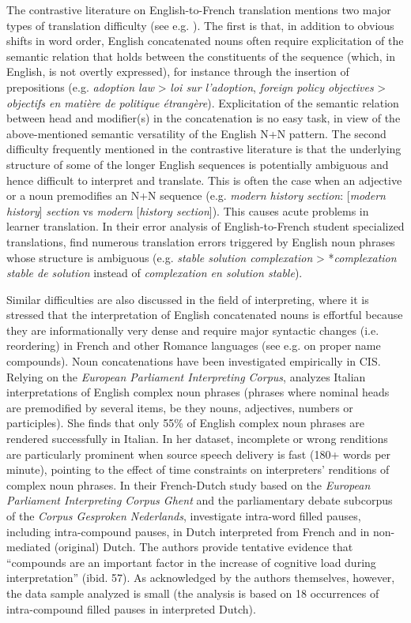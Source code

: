 \documentclass[output=paper]{langscibook}
\begin{document}
The contrastive literature on English-to-French translation mentions two major types of translation difficulty (see e.g. \citealt{ChuquetPaillard1987}). The first is that, in addition to obvious shifts in word order, English concatenated nouns often require explicitation of the semantic relation that holds between the constituents of the sequence (which, in English, is not overtly expressed), for instance through the insertion of prepositions (e.g. \textit{adoption law} > \textit{loi sur l’adoption}, \textit{foreign policy objectives} > \textit{objectifs en matière de politique étrangère}). Explicitation of the semantic relation between head and modifier(s) in the concatenation is no easy task, in view of the above-mentioned semantic versatility of the English N+N pattern. The second difficulty frequently mentioned in the contrastive literature is that the underlying structure of some of the longer English sequences is potentially ambiguous and hence difficult to interpret and translate. This is often the case when an adjective or a noun premodifies an N+N sequence (e.g. \textit{modern history section}: [\textit{modern history}] \textit{section} vs \textit{modern} [\textit{history section}]). This causes acute problems in learner translation. In their error analysis of English-to-French student specialized translations, \citet{KueblerEtAl2022} find numerous translation errors triggered by English noun phrases whose structure is ambiguous (e.g. \textit{stable solution complexation} > *\textit{complexation stable de solution} instead of \textit{complexation en solution stable}). 

Similar difficulties are also discussed in the field of interpreting, where it is stressed that the interpretation of English concatenated nouns is effortful because they are informationally very dense and require major syntactic changes (i.e. reordering) in French and other Romance languages (see e.g. \citealt{Gile1995} on proper name compounds). Noun concatenations have been investigated empirically in CIS. Relying on the \textit{European Parliament Interpreting Corpus}, \citet{Ghiselli2018} analyzes Italian interpretations of English complex noun phrases (phrases where nominal heads are premodified by several items, be they nouns, adjectives, numbers or participles). She finds that only 55\% of English complex noun phrases are rendered successfully in Italian. In her dataset, incomplete or wrong renditions are particularly prominent when source speech delivery is fast (180+ words per minute), pointing to the effect of time constraints on interpreters’ renditions of complex noun phrases. In their French-Dutch study based on the \textit{European Parliament Interpreting Corpus Ghent} and the parliamentary debate subcorpus of the \textit{Corpus Gesproken Nederlands}, \citet{DefrancqPlevoets2018} investigate intra-word filled pauses, including intra-compound pauses, in Dutch interpreted from French and in non-mediated (original) Dutch. The authors provide tentative evidence that “compounds are an important factor in the increase of cognitive load during interpretation” (ibid. 57). As acknowledged by the authors themselves, however, the data sample analyzed is small (the analysis is based on 18 occurrences of intra-compound filled pauses in interpreted Dutch). 
\end{document}
